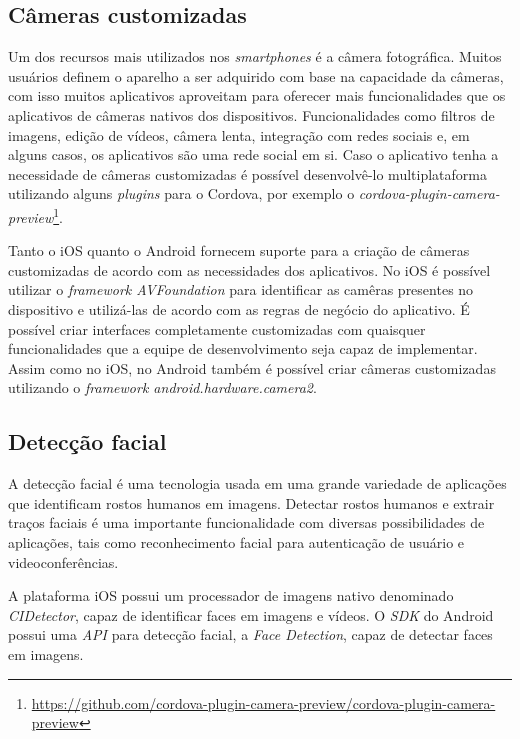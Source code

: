 \subsection{Câmeras customizadas} \label{subsec:customcamera}

Um dos recursos mais utilizados nos \textit{smartphones} é a câmera fotográfica. Muitos usuários definem o aparelho a ser adquirido com base na capacidade da câmeras, com isso muitos aplicativos aproveitam para 
oferecer mais funcionalidades que os aplicativos de câmeras nativos dos dispositivos. Funcionalidades como filtros de imagens, edição de vídeos, câmera lenta, integração com redes sociais e, em alguns casos, os aplicativos 
são uma rede social em si. Caso o aplicativo tenha a necessidade de câmeras customizadas é possível desenvolvê-lo multiplataforma utilizando alguns \textit{plugins} para o Cordova, por exemplo o 
\textit{cordova-plugin-camera-preview}\footnote{\url{https://github.com/cordova-plugin-camera-preview/cordova-plugin-camera-preview}}.

Tanto o iOS quanto o Android fornecem suporte para a criação de câmeras customizadas de acordo com as necessidades dos aplicativos. No iOS é possível utilizar o \textit{framework AVFoundation} para identificar as camêras 
presentes no dispositivo e utilizá-las de acordo com as regras de negócio do aplicativo. É possível criar interfaces completamente customizadas com quaisquer funcionalidades que a equipe de desenvolvimento seja capaz de 
implementar. Assim como no iOS, no Android também é possível criar câmeras customizadas utilizando o \textit{framework android.hardware.camera2}.

\subsection{Detecção facial} \label{subsec:facial}
A detecção facial é uma tecnologia usada em uma grande variedade de aplicações que identificam rostos humanos em imagens. Detectar rostos humanos e extrair traços faciais é uma importante funcionalidade com diversas 
possibilidades de aplicações, tais como reconhecimento facial para autenticação de usuário e videoconferências. %

A plataforma iOS possui um processador de imagens nativo denominado \textit{CIDetector}, capaz de identificar faces em imagens e vídeos. O \textit{SDK} do Android possui uma \textit{API} para detecção facial, 
a \textit{Face Detection}, capaz de detectar faces em imagens.

